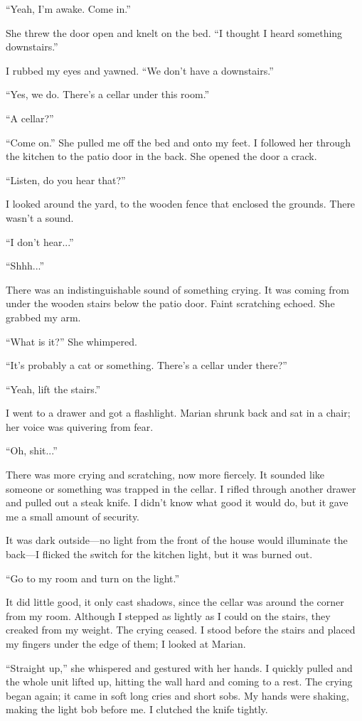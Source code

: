 \documentclass[
]{article}
\begin{document}
``Yeah, I'm awake. Come in.''

She threw the door open and knelt on the bed. ``I thought I heard
something downstairs.''

I rubbed my eyes and yawned. ``We don't have a downstairs.''

``Yes, we do. There's a cellar under this room.''

``A cellar?''

``Come on.'' She pulled me off the bed and onto my feet. I followed her
through the kitchen to the patio door in the back. She opened the door a
crack.

``Listen, do you hear that?''

I looked around the yard, to the wooden fence that enclosed the grounds.
There wasn't a sound.

``I don't hear...''

``Shhh...''

There was an indistinguishable sound of something crying. It was coming
from under the wooden stairs below the patio door. Faint scratching
echoed. She grabbed my arm.

``What is it?'' She whimpered.

``It's probably a cat or something. There's a cellar under there?''

``Yeah, lift the stairs.''

I went to a drawer and got a flashlight. Marian shrunk back and sat in a
chair; her voice was quivering from fear.

``Oh, shit...''

There was more crying and scratching, now more fiercely. It sounded like
someone or something was trapped in the cellar. I rifled through another
drawer and pulled out a steak knife. I didn't know what good it would
do, but it gave me a small amount of security.

It was dark outside---no light from the front of the house would
illuminate the back---I flicked the switch for the kitchen light, but it
was burned out.

``Go to my room and turn on the light.''

It did little good, it only cast shadows, since the cellar was around
the corner from my room. Although I stepped as lightly as I could on the
stairs, they creaked from my weight. The crying ceased. I stood before
the stairs and placed my fingers under the edge of them; I looked at
Marian.

``Straight up,'' she whispered and gestured with her hands. I quickly
pulled and the whole unit lifted up, hitting the wall hard and coming to
a rest. The crying began again; it came in soft long cries and short
sobs. My hands were shaking, making the light bob before me. I clutched
the knife tightly.
\end{document}
